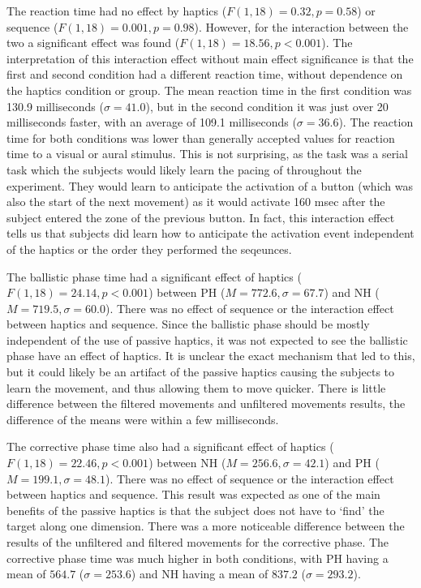 The reaction time had no effect by haptics ($F(1,18)=0.32, p=0.58$) or sequence ($F(1,18)=0.001, p=0.98$).
However, for the interaction between the two a significant effect was found ($F(1,18)=18.56, p<0.001$).
The interpretation of this interaction effect without main effect significance is that the first and second condition had a different reaction time, without dependence on the haptics condition or group.
The mean reaction time in the first condition was 130.9 milliseconds ($\sigma=41.0$), but in the second condition it was just over 20 milliseconds faster, with an average of 109.1 milliseconds ($\sigma=36.6$).
The reaction time for both conditions was lower than generally accepted values for reaction time to a visual or aural stimulus.
This is not surprising, as the task was a serial task which the subjects would likely learn the pacing of throughout the experiment.
They would learn to anticipate the activation of a button (which was also the start of the next movement) as it would activate 160 msec after the subject entered the zone of the previous button.
In fact, this interaction effect tells us that subjects did learn how to anticipate the activation event independent of the haptics or the order they performed the seqeunces.

The ballistic phase time had a significant effect of haptics ($F(1, 18)=24.14, p<0.001$) between PH ($M=772.6, \sigma=67.7$) and NH ($M=719.5, \sigma=60.0$).
There was no effect of sequence or the interaction effect between haptics and sequence.
Since the ballistic phase should be mostly independent of the use of passive haptics, it was not expected to see the ballistic phase have an effect of haptics.
It is unclear the exact mechanism that led to this, but it could likely be an artifact of the passive haptics causing the subjects to learn the movement, and thus allowing them to move quicker.
There is little difference between the filtered movements and unfiltered movements results, the difference of the means were within a few milliseconds.

The corrective phase time also had a significant effect of haptics ($F(1, 18)=22.46, p<0.001$) between NH ($M=256.6, \sigma=42.1$) and PH ($M=199.1, \sigma=48.1$).
There was no effect of sequence or the interaction effect between haptics and sequence.
This result was expected as one of the main benefits of the passive haptics is that the subject does not have to `find' the target along one dimension.
There was a more noticeable difference between the results of the unfiltered and filtered movements for the corrective phase.
The corrective phase time was much higher in both conditions, with PH having a mean of $564.7$ ($\sigma=253.6$) and NH having a mean of $837.2$ ($\sigma=293.2$).

